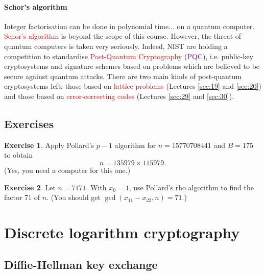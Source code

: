 \documentclass[a4paper, 11pt, openany]{book}
\numberwithin{equation}{section}
\theoremstyle{plain}
\theoremstyle{definition}
\newtheorem{exercise}   {Exercise}  [section]
\newcommand{\Important}[1]{\textcolor{red}{#1}}
\newcommand{\Define}[1]{\textcolor{purple}{#1}}
\begin{document}
\paragraph{Schor's algorithm}
Integer factorisation can be done in polynomial time... on a quantum computer. \Important{Schor's algorithm} is beyond the scope of this course. However, the threat of quantum computers is taken very seriously. Indeed, NIST are holding a competition to standardise \Important{Post-Quantum Cryptography} (\Define{PQC}), i.e. public-key cryptosystems and signature schemes based on problems which are believed to be secure against quantum attacks. There are two main kinds of post-quantum cryptosystems left: those based on \Important{lattice problems} (Lectures \ref{sec:19} and \ref{sec:20}) and those based on \Important{error-correcting codes} (Lectures \ref{sec:29} and \ref{sec:30}).

\subsection{Exercises}

\begin{exercise}
Apply Pollard's $p-1$ algorithm for $n = 15770708441$ and $B = 175$ to obtain
\[
    n = 135979 \times 115979.
\]
(Yes, you need a computer for this one.)
\end{exercise}


\begin{exercise}
Let $n = 7171$. With $x_0 = 1$, use Pollard's rho algorithm to find the factor $71$ of $n$. (You should get $\gcd(x_{11} - x_{22}, n) = 71$.)
\end{exercise}


























\section{Discrete logarithm cryptography}
\label{sec:16}

\subsection{Diffie-Hellman key exchange}
\end{document}
